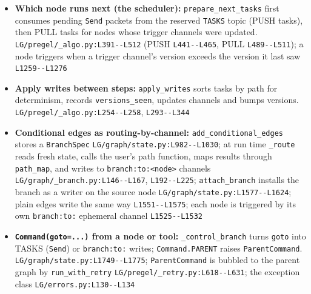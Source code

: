 \begin{itemize}
\item \textbf{Which node runs next (the scheduler):} \texttt{prepare\_\allowbreak{}next\_\allowbreak{}tasks} first consumes pending \texttt{Send} packets from the reserved \texttt{TASKS} topic (PUSH tasks), then PULL tasks for nodes whose trigger channels were updated. \texttt{LG/\allowbreak{}pregel/\allowbreak{}\_\allowbreak{}algo.\allowbreak{}py:\allowbreak{}L391-\allowbreak{}-\allowbreak{}L512} (PUSH \texttt{L441-\allowbreak{}-\allowbreak{}L465}, PULL \texttt{L489-\allowbreak{}-\allowbreak{}L511}); a node triggers when a trigger channel's version exceeds the version it last saw \texttt{L1259-\allowbreak{}-\allowbreak{}L1276}
\item \textbf{Apply writes between steps:} \texttt{apply\_\allowbreak{}writes} sorts tasks by path for determinism, records \texttt{versions\_\allowbreak{}seen}, updates channels and bumps versions. \texttt{LG/\allowbreak{}pregel/\allowbreak{}\_\allowbreak{}algo.\allowbreak{}py:\allowbreak{}L254-\allowbreak{}-\allowbreak{}L258}, \texttt{L293-\allowbreak{}-\allowbreak{}L344}
\item \textbf{Conditional edges as routing-by-channel:} \texttt{add\_\allowbreak{}conditional\_\allowbreak{}edges} stores a \texttt{BranchSpec} \texttt{LG/\allowbreak{}graph/\allowbreak{}state.\allowbreak{}py:\allowbreak{}L982-\allowbreak{}-\allowbreak{}L1030}; at run time \texttt{\_\allowbreak{}route} reads fresh state, calls the user's path function, maps results through \texttt{path\_\allowbreak{}map}, and writes to \texttt{branch:\allowbreak{}to:\allowbreak{}<node>} channels \texttt{LG/\allowbreak{}graph/\allowbreak{}\_\allowbreak{}branch.\allowbreak{}py:\allowbreak{}L146-\allowbreak{}-\allowbreak{}L167}, \texttt{L192-\allowbreak{}-\allowbreak{}L225}; \texttt{attach\_\allowbreak{}branch} installs the branch as a writer on the source node \texttt{LG/\allowbreak{}graph/\allowbreak{}state.\allowbreak{}py:\allowbreak{}L1577-\allowbreak{}-\allowbreak{}L1624}; plain edges write the same way \texttt{L1551-\allowbreak{}-\allowbreak{}L1575}; each node is triggered by its own \texttt{branch:\allowbreak{}to:\allowbreak{}} ephemeral channel \texttt{L1525-\allowbreak{}-\allowbreak{}L1532}
\item \textbf{\texttt{Command(\allowbreak{}goto=.\allowbreak{}.\allowbreak{}.\allowbreak{})} from a node or tool:} \texttt{\_\allowbreak{}control\_\allowbreak{}branch} turns \texttt{goto} into TASKS (\texttt{Send}) or \texttt{branch:\allowbreak{}to:\allowbreak{}} writes; \texttt{Command.\allowbreak{}PARENT} raises \texttt{ParentCommand}. \texttt{LG/\allowbreak{}graph/\allowbreak{}state.\allowbreak{}py:\allowbreak{}L1749-\allowbreak{}-\allowbreak{}L1775}; \texttt{ParentCommand} is bubbled to the parent graph by \texttt{run\_\allowbreak{}with\_\allowbreak{}retry} \texttt{LG/\allowbreak{}pregel/\allowbreak{}\_\allowbreak{}retry.\allowbreak{}py:\allowbreak{}L618-\allowbreak{}-\allowbreak{}L631}; the exception class \texttt{LG/\allowbreak{}errors.\allowbreak{}py:\allowbreak{}L130-\allowbreak{}-\allowbreak{}L134}

\end{itemize}
